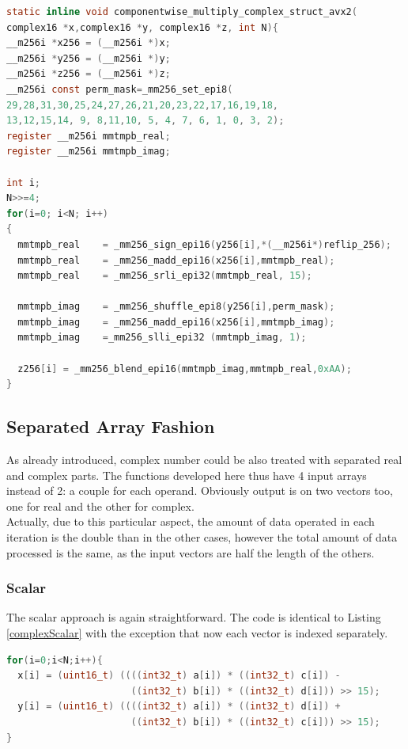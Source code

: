 \documentclass[a4paper]{article}
\begin{document}
\begin{lstlisting}[language=c,frame=tb,caption=AVX2 Complex Fixed Point Multiplication - Interleaved Fashion,label=complexSIMD]
static inline void componentwise_multiply_complex_struct_avx2(
complex16 *x,complex16 *y, complex16 *z, int N){
__m256i *x256 = (__m256i *)x;
__m256i *y256 = (__m256i *)y;
__m256i *z256 = (__m256i *)z;
__m256i const perm_mask=_mm256_set_epi8(
29,28,31,30,25,24,27,26,21,20,23,22,17,16,19,18,
13,12,15,14, 9, 8,11,10, 5, 4, 7, 6, 1, 0, 3, 2);
register __m256i mmtmpb_real;
register __m256i mmtmpb_imag;

int i;
N>>=4;
for(i=0; i<N; i++)
{
  mmtmpb_real    = _mm256_sign_epi16(y256[i],*(__m256i*)reflip_256);
  mmtmpb_real    = _mm256_madd_epi16(x256[i],mmtmpb_real);
  mmtmpb_real    = _mm256_srli_epi32(mmtmpb_real, 15);

  mmtmpb_imag    = _mm256_shuffle_epi8(y256[i],perm_mask);
  mmtmpb_imag    = _mm256_madd_epi16(x256[i],mmtmpb_imag);
  mmtmpb_imag    =_mm256_slli_epi32 (mmtmpb_imag, 1);

  z256[i] = _mm256_blend_epi16(mmtmpb_imag,mmtmpb_real,0xAA);
}
\end{lstlisting}

\subsection{Separated Array Fashion}
As already introduced, complex number could be also treated with separated real and complex parts. The functions developed here thus have 4 input arrays instead of 2: a couple for each operand. Obviously output is on two vectors too, one for real and the other for complex.
\\Actually, due to this particular aspect, the amount of data operated in each iteration is the double than in the other cases, however the total amount of data processed is the same, as the input vectors are half the length of the others.

\subsubsection{Scalar}
The scalar approach is again straightforward. The code is identical to Listing \ref{complexScalar} with the exception that now each vector is indexed separately.
\begin{lstlisting}[language=c,frame=tb,caption=Scalar Complex Fixed Point Multiplication - Separeted Array Fashion,label=complexScalarArray]
for(i=0;i<N;i++){    
  x[i] = (uint16_t) ((((int32_t) a[i]) * ((int32_t) c[i]) -
                      ((int32_t) b[i]) * ((int32_t) d[i])) >> 15);
  y[i] = (uint16_t) ((((int32_t) a[i]) * ((int32_t) d[i]) +
                      ((int32_t) b[i]) * ((int32_t) c[i])) >> 15);	
}
\end{lstlisting} 
\end{document}

